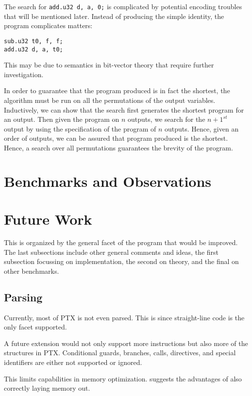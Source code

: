 \documentclass[letterpaper,twocolumn,10pt]{article}
\begin{document}
The search for \texttt{add.u32 d, a, 0;} is complicated by potential encoding
troubles that will be mentioned later. Instead of producing the simple
identity, the program complicates matters:
\begin{lstlisting}
sub.u32 t0, f, f;
add.u32 d, a, t0;
\end{lstlisting}
This may be due to semantics in bit-vector theory that require
further investigation.

In order to guarantee that the program produced is in fact the shortest,
the algorithm must be run on all the permutations of the output variables.
Inductively, we can show that the search first generates the shortest
program for an output. Then given the program on $n$ outputs, we search
for the $n + 1^{st}$ output by using the specification of the program of
$n$ outputs. Hence, given an order of outputs, we can be assured that program
produced is the shortest. Hence, a search over all permutations guarantees the
brevity of the program.

\section{Benchmarks and Observations}



\section{Future Work}

This is organized by the general facet of the program that would be improved.
The last subsections include other general comments and ideas, the first subsection
focussing on implementation, the second on theory, and the final on other benchmarks.

\subsection{Parsing}

Currently, most of PTX is not even parsed. This is since straight-line
code is the only facet supported.

A future extension would not only support more instructions but also more
of the structures in PTX. Conditional guards, branches, calls, directives,
and special identifiers are either not supported or ignored.

This limits capabilities in memory optimization. \cite{CUDALoops} suggests
the advantages of also correctly laying memory out.
\end{document}
